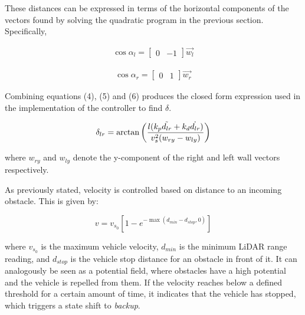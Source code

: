 \documentclass[conference]{IEEEtran}
\begin{document}
These distances can be expressed in terms of the horizontal components of the vectors found by solving the quadratic program in the previous section. Specifically, 


\begin{equation}
    \begin{aligned}
        \cos \alpha_l = \begin{bmatrix}
            0 & -1
        \end{bmatrix} \Vec{w_l} 
    \end{aligned}
\end{equation}

\begin{equation}
    \begin{aligned}
         \cos \alpha_r = \begin{bmatrix}
            0 & 1
        \end{bmatrix} \Vec{w_r}
    \end{aligned}
\end{equation}


Combining equations (4), (5) and (6) produces the closed form expression used in the implementation of the controller to find $\delta$.

\begin{equation}
    \begin{aligned}
        \delta_{lr} = \arctan \left( \frac{l(k_p \Tilde{d_{lr}}+ k_d \dot{d_{lr}})}{v_s^2(w_{ry} - w_{ly})} \right)
    \end{aligned}
\end{equation}

where $w_{ry}$ and $w_{ly}$ denote the y-component of the right and left wall vectors respectively.  



As previously stated, velocity is controlled based on distance to an incoming obstacle. This is given by:

\begin{equation}
    v = v_{s_0}\left[1-e^{-\max(d_{min}-d_{stop},0)}\right]
\end{equation}

where $v_{s_0}$ is the maximum vehicle velocity, $d_{min}$ is the minimum LiDAR range reading, and $d_{stop}$ is the vehicle stop distance for an obstacle in front of it. It can analogously be seen as a potential field, where obstacles have a high potential and  the vehicle is repelled from them. If the velocity reaches below a defined threshold for a certain amount of time, it indicates that the vehicle has stopped, which triggers a state shift to \textit{backup}. 
\end{document}
